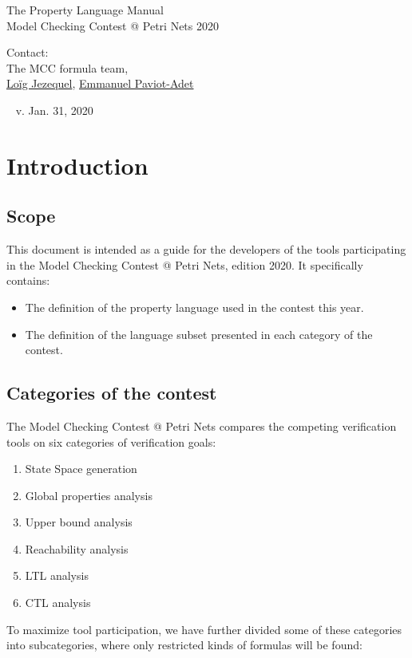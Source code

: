 \documentclass[10pt,english,a4paper]{article}
\makeatletter
\newcommand{\mcc}[0]{MCC}
\newcommand{\mccl}[0]{Model Checking Contest @ Petri Nets}
\newcommand\mysection[1]{\color{sectioncolor}\section{#1}\color{defaultcolor}}
\newcommand\mysubsection[1]{\color{sectioncolor}\subsection{#1}\color{defaultcolor}}
\makeatother
\begin{document}
\color{defaultcolor}

\vspace*{5cm}
\Huge
The Property Language Manual \\[10pt]
\Large
Model Checking Contest @ Petri Nets 2020

\vspace{3cm}
\large
Contact: \\[15pt]
The \mcc{} formula team, \\
\href{mailto:loig.jezequel@univ-nantes.fr}{Loïg Jezequel},
\href{mailto:emmanuel.paviot-adet@lip6.fr}{Emmanuel Paviot-Adet}
\vspace{2cm}

\vfill
~
\hfill
\scriptsize
v\@. Jan\@. 31, 2020
\normalsize

\clearpage
\tableofcontents

\clearpage
\mysection{Introduction}

\mysubsection{Scope}

This document is intended as a guide for the developers of
the tools participating in the \mccl{}, edition 2020.
It specifically contains:

\begin{itemize}
\item
  The definition of the property language used in the contest this year.
\item
  The definition of the language subset presented in each category of the
  contest.
\end{itemize}

\mysubsection{Categories of the contest}

The \mccl{} compares the competing verification tools on six
categories of verification goals:

\begin{enumerate}
\item State Space generation
\item Global properties analysis
\item Upper bound analysis
\item Reachability analysis
\item LTL analysis
\item CTL analysis
\end{enumerate}

To maximize tool participation, we have further divided some of these categories
into subcategories, where only restricted kinds of formulas
will be found:
\end{document}
